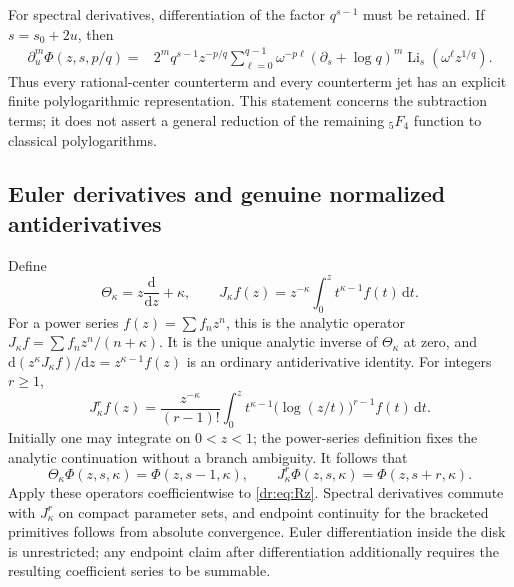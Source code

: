 \documentclass[11pt,letterpaper]{article}
\numberwithin{equation}{section}
\theoremstyle{definition}
\theoremstyle{remark}
\DeclareMathOperator{\Li}{Li}
\newcommand{\dd}{\,\mathrm d}
\begin{document}
For spectral derivatives, differentiation of the factor $q^{s-1}$ must
be retained. If $s=s_0+2u$, then
\begin{align}
 \partial_u^m\Phi(z,s,p/q)
 ={}&2^m q^{s-1}z^{-p/q}\sum_{\ell=0}^{q-1}\omega^{-p\ell}
       (\partial_s+\log q)^m
                   \Li_s(\omega^\ell z^{1/q}).
 \label{dr:eq:root-jets}
\end{align}
Thus every rational-center counterterm and every counterterm jet has an
explicit finite polylogarithmic representation. This statement concerns
the subtraction terms; it does not assert a general reduction of the
remaining ${}_5F_4$ function to classical polylogarithms.

\subsection{Euler derivatives and genuine normalized antiderivatives}

Define
\begin{equation}
 \Theta_\kappa=z\frac{\mathrm d}{\mathrm dz}+\kappa,
 \qquad
 J_\kappa f(z)=z^{-\kappa}\int_0^z t^{\kappa-1}f(t)\dd t.
 \label{dr:eq:Euler}
\end{equation}
For a power series $f(z)=\sum f_nz^n$, this is the analytic operator
$J_\kappa f=\sum f_nz^n/(n+\kappa)$. It is the unique analytic inverse
of $\Theta_\kappa$ at zero, and
$\mathrm d(z^\kappa J_\kappa f)/\mathrm dz=z^{\kappa-1}f(z)$ is an
ordinary antiderivative identity. For integers $r\geq1$,
\begin{equation}
 J_\kappa^r f(z)=\frac{z^{-\kappa}}{(r-1)!}
     \int_0^z t^{\kappa-1}\bigl(\log(z/t)\bigr)^{r-1}f(t)\dd t.
 \label{dr:eq:iterated-primitive}
\end{equation}
Initially one may integrate on $0<z<1$; the power-series definition fixes
the analytic continuation without a branch ambiguity. It follows that
\begin{equation}
 \Theta_\kappa\Phi(z,s,\kappa)=\Phi(z,s-1,\kappa),
 \qquad J_\kappa^r\Phi(z,s,\kappa)=\Phi(z,s+r,\kappa).
 \label{dr:eq:Phi-primitive}
\end{equation}
Apply these operators coefficientwise to \eqref{dr:eq:Rz}. Spectral
derivatives commute with $J_\kappa^r$ on compact parameter sets, and
endpoint continuity for the bracketed primitives follows from absolute
convergence. Euler differentiation inside the disk is unrestricted;
any endpoint claim after differentiation additionally requires the
resulting coefficient series to be summable.
\end{document}
